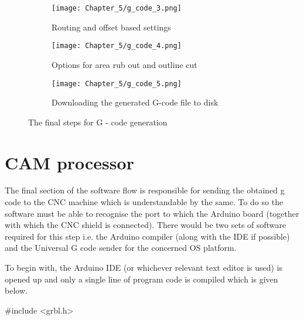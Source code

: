 \begin{figure}[h]
    \begin{subfigure}{0.5\textwidth}
    \texttt{[image: Chapter\_5/g\_code\_3.png]}
    \caption{Routing and offset based settings}
    \label{fig:g3}
    \end{subfigure}
    \begin{subfigure}{0.5\textwidth}
    \texttt{[image: Chapter\_5/g\_code\_4.png]}
    \caption{Options for area rub out and outline cut}
    \label{fig:g4}
    \end{subfigure}  
    \begin{center}
    \begin{subfigure}{0.5\textwidth}
    \texttt{[image: Chapter\_5/g\_code\_5.png]}
    \caption{Downloading the generated G-code file to disk}
    \label{fig:g5}
    \end{subfigure} 
    \end{center}
    
    \caption{The final steps for G - code generation}
    \label{fig:g345}
\end{figure}

\section{CAM processor}

The final section of the software flow is responsible for sending the obtained g code to the CNC machine which is understandable by the same. To do so the software must be able to recognise the port to which the Arduino board (together with which the CNC shield is connected). There would be two sets of software required for this step i.e. the Arduino compiler (along with the IDE if possible) and the Universal G code sender for the concerned OS platform. \par

To begin with, the Arduino IDE (or whichever relevant text editor is used) is opened up and only a single line of program code is compiled which is given below.

 {\selectfont \#include <grbl.h>}

